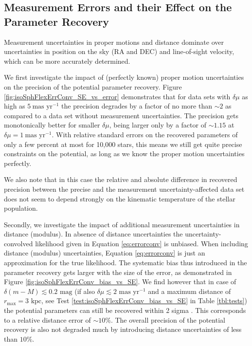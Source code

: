 \subsection{Measurement Errors and their Effect on the Parameter Recovery} \label{sec:results_errors}

Measurement uncertainties in proper motions and distance dominate over uncertainties in position on the sky (RA and DEC) and line-of-sight velocity, which can be more accurately determined.

We first investigate the impact of (perfectly known) proper motion uncertainties on the precision of the potential parameter recovery. Figure \ref{fig:isoSphFlexErrConv_SE_vs_error} demonstrates that for data sets with $\delta \mu$ as high as $5~\text{mas yr}^{-1}$ the precision degrades by  a factor of no more than $\sim2$ as compared to a data set without measurement uncertainties. The precision gets monotonically better for smaller $\delta \mu$, being larger only by a factor of $\sim 1.15$ at $\delta \mu=1~\text{mas yr}^{-1}$. With relative standard errors on the recovered parameters of only a few percent at most for 10,000 stars, this means we still get quite precise constraints on the potential, as long as we know the proper motion uncertainties perfectly.

We also note that in this case the relative and absolute difference in recovered precision between the precise and the measurement uncertainty-affected data set does not seem to depend strongly on the kinematic temperature of the stellar population.

Secondly, we investigate the impact of additional measurement uncertainties in distance (modulus). In absence of distance uncertainties the uncertainty-convolved likelihood given in Equation \ref{eq:errorconv} is unbiased.  When including distance (modulus) uncertainties, Equation \ref{eq:errorconv} is just an approximation for the true likelihood. The systematic bias thus introduced in the parameter recovery gets larger with the size of the error, as demonstrated in Figure \ref{fig:isoSphFlexErrConv_bias_vs_SE}.  We find however that in case of $\delta(m-M) \lesssim 0.2 \text{ mag}$ (if also $\delta \mu \lesssim 2 \text{ mas yr}^{-1}$ and a maximum distance of $r_\text{max} = 3 \text{ kpc}$, see Test \ref{test:isoSphFlexErrConv_bias_vs_SE} in Table \ref{tbl:tests}) the potential parameters can still be recovered within 2 sigma . This corresponds to a relative distance error of $\sim10\%$. The overall precision of the potential recovery is also not degraded much by introducing distance uncertainties of less than $10\%$.

